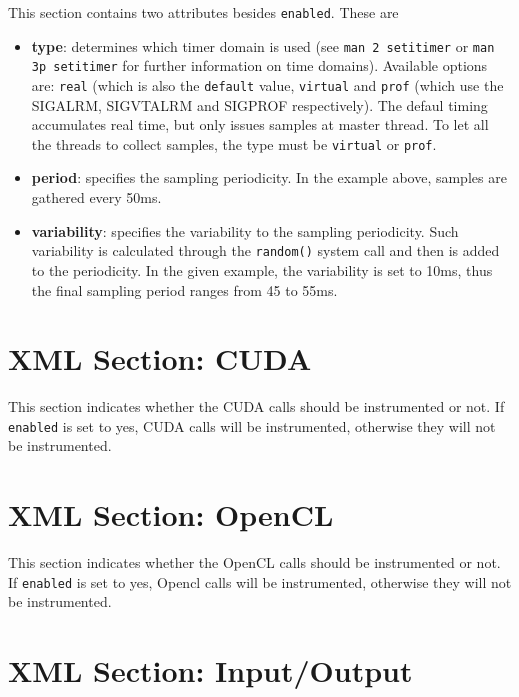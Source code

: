 This section contains two attributes besides {\tt enabled}. These are
\begin{itemize}
 \item {\bf type}: determines which timer domain is used (see {\tt man 2 setitimer} or {\tt man 3p setitimer} for further information on time domains). Available options are: {\tt real} (which is also the {\tt default} value, {\tt virtual} and {\tt prof} (which use the SIGALRM, SIGVTALRM and SIGPROF respectively). The defaul timing accumulates real time, but only issues samples at master thread. To let all the threads to collect samples, the type must be {\tt virtual} or {\tt prof}.
 \item {\bf period}: specifies the sampling periodicity. In the example above, samples are gathered every 50ms.
 \item {\bf variability}: specifies the variability to the sampling periodicity. Such variability is calculated through the {\tt random()} system call and then is added to the periodicity. In the given example, the variability is set to 10ms, thus the final sampling period ranges from 45 to 55ms.
\end{itemize}


\section{XML Section: CUDA}\label{sec:XMLSectionCUDA}



This section indicates whether the CUDA calls should be instrumented or not. If {\tt enabled} is set to yes, CUDA calls will be instrumented, otherwise they will not be instrumented.

\section{XML Section: OpenCL}\label{sec:XMLSectionOPENCL}



This section indicates whether the OpenCL calls should be instrumented or not. If {\tt enabled} is set to yes, Opencl calls will be instrumented, otherwise they will not be instrumented.

\section{XML Section: Input/Output}\label{sec:XMLSectionIO}

